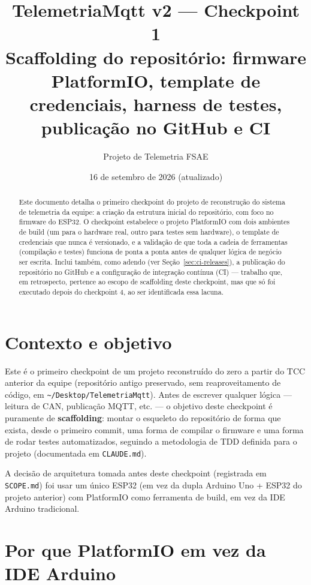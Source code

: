 \documentclass[11pt,a4paper]{article}
\title{\textbf{TelemetriaMqtt v2 --- Checkpoint 1} \\[4pt]
\large Scaffolding do repositório: firmware PlatformIO, template de credenciais, harness de testes, publicação no GitHub e CI}
\author{Projeto de Telemetria FSAE}
\date{16 de setembro de 2026 (atualizado)}
\begin{document}
\maketitle

\begin{abstract}
\noindent Este documento detalha o primeiro checkpoint do projeto de reconstrução do sistema de telemetria da equipe: a criação da estrutura inicial do repositório, com foco no firmware do ESP32. O checkpoint estabelece o projeto PlatformIO com dois ambientes de build (um para o hardware real, outro para testes sem hardware), o template de credenciais que nunca é versionado, e a validação de que toda a cadeia de ferramentas (compilação e testes) funciona de ponta a ponta antes de qualquer lógica de negócio ser escrita. Inclui também, como adendo (ver Seção~\ref{sec:ci-releases}), a publicação do repositório no GitHub e a configuração de integração contínua (CI) --- trabalho que, em retrospecto, pertence ao escopo de scaffolding deste checkpoint, mas que só foi executado depois do checkpoint 4, ao ser identificada essa lacuna.
\end{abstract}

\tableofcontents

\section{Contexto e objetivo}

Este é o primeiro checkpoint de um projeto reconstruído do zero a partir do TCC anterior da equipe (repositório antigo preservado, sem reaproveitamento de código, em \texttt{\textasciitilde/Desktop/TelemetriaMqtt}). Antes de escrever qualquer lógica --- leitura de CAN, publicação MQTT, etc. --- o objetivo deste checkpoint é puramente de \textbf{scaffolding}: montar o esqueleto do repositório de forma que exista, desde o primeiro commit, uma forma de compilar o firmware e uma forma de rodar testes automatizados, seguindo a metodologia de TDD definida para o projeto (documentada em \texttt{CLAUDE.md}).

A decisão de arquitetura tomada antes deste checkpoint (registrada em \texttt{SCOPE.md}) foi usar um único ESP32 (em vez da dupla Arduino Uno + ESP32 do projeto anterior) com PlatformIO como ferramenta de build, em vez da IDE Arduino tradicional.

\section{Por que PlatformIO em vez da IDE Arduino}
\end{document}
